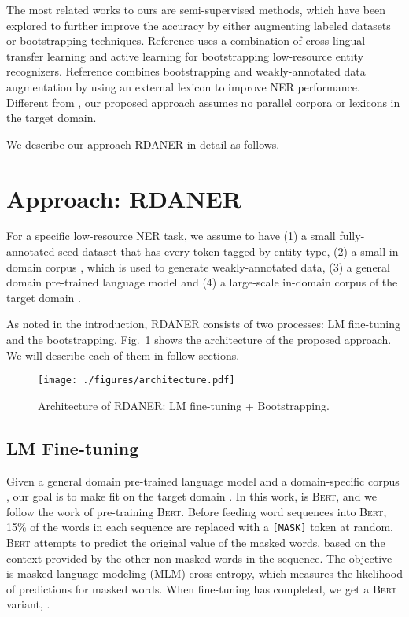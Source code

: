 \documentclass[10pt, conference, compsocconf]{IEEEtran}
\newcommand{\bert}{\textsc{Bert}\xspace}
\newcommand{\rdaner}{\textsc{RDANER}\xspace}
\begin{document}
The most related works to ours are semi-supervised methods, which have been explored to further improve the accuracy 
by either augmenting labeled datasets or bootstrapping techniques\cite{he2017unified,chaudhary-etal-2019-little,mathew2019biomedical}.
Reference\cite{chaudhary-etal-2019-little} uses a combination of cross-lingual
transfer learning and active learning for bootstrapping low-resource entity
recognizers. Reference\cite{mathew2019biomedical} combines bootstrapping
and weakly-annotated data augmentation by using an external lexicon to improve NER performance.
Different from \cite{chaudhary-etal-2019-little,mathew2019biomedical}, our proposed approach assumes no
parallel corpora or lexicons in the target domain.

We describe our approach \rdaner in detail as follows.

\section{Approach: \rdaner}

For a specific low-resource NER task, we assume to have 
(1) a small fully-annotated seed dataset  that has every token
tagged by entity type, 
(2) a small in-domain corpus , which is used  to generate weakly-annotated data, 
(3) a general domain pre-trained language model  and 
(4) a large-scale in-domain corpus   of the target domain .


As noted in the introduction, \rdaner consists of two processes: LM
fine-tuning and the bootstrapping.
Fig.~\ref{fig:architecture} shows the architecture of the proposed approach. 
We will describe each of them in follow sections.
\begin{figure}[!t]
    \centering
    \texttt{[image: ./figures/architecture.pdf]}
    \caption{Architecture of \rdaner: LM fine-tuning + Bootstrapping.}
    \label{fig:architecture}
  \end{figure}




\subsection{LM Fine-tuning}

Given a general domain pre-trained language model  and a domain-specific corpus , 
our goal is to make  fit on the target domain .
In this work,  is \bert, and we follow the work of pre-training \bert\cite{devlin2018bert}.
Before feeding word sequences into \bert, 
15\% of the words in each sequence are replaced with a {\tt [MASK]} token at random. 
\bert attempts to predict the original value of the masked words, 
based on the context provided by the other non-masked words in the sequence.
The objective is masked language modeling (MLM) cross-entropy\cite{devlin2018bert},
which measures the likelihood of predictions for masked words.
When fine-tuning has completed, we get a \bert variant, .
\end{document}
